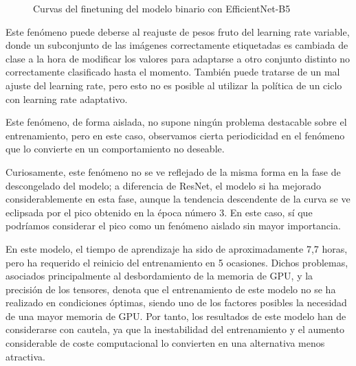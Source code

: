 \begin{figure}[H]
	\centering
	\caption{Curvas del finetuning del modelo binario con EfficientNet-B5}
	\label{fig:curvasefnetbinaria}
\end{figure}

Este fenómeno puede deberse al reajuste de pesos fruto del learning rate variable, donde un subconjunto de las imágenes correctamente etiquetadas es cambiada de clase a la hora de modificar los valores para adaptarse a otro conjunto distinto no correctamente clasificado hasta el momento. También puede tratarse de un mal ajuste del learning rate, pero esto no es posible al utilizar la política de un ciclo con learning rate adaptativo.

Este fenómeno, de forma aislada, no supone ningún problema destacable sobre el entrenamiento, pero en este caso, observamos  cierta periodicidad en el fenómeno que lo convierte en un comportamiento no deseable.

Curiosamente, este fenómeno no se ve reflejado de la misma forma en la fase de descongelado del modelo; a diferencia de ResNet, el modelo si ha mejorado considerablemente en esta fase, aunque la tendencia descendente de la curva se ve eclipsada por el pico obtenido en la época número 3. En este caso, sí que podríamos considerar el pico como un fenómeno aislado sin mayor importancia.

 En este modelo, el tiempo de aprendizaje ha sido de aproximadamente 7,7 horas, pero ha requerido el reinicio del entrenamiento en 5 ocasiones. Dichos problemas, asociados principalmente al desbordamiento de la memoria de GPU, y la precisión de los tensores, denota que el entrenamiento de este modelo no se ha realizado en condiciones óptimas, siendo uno de los factores posibles la necesidad de una mayor memoria de GPU. Por tanto, los resultados de este modelo han de considerarse con cautela, ya que la inestabilidad del entrenamiento y el aumento considerable de coste computacional lo convierten en una alternativa menos atractiva.

